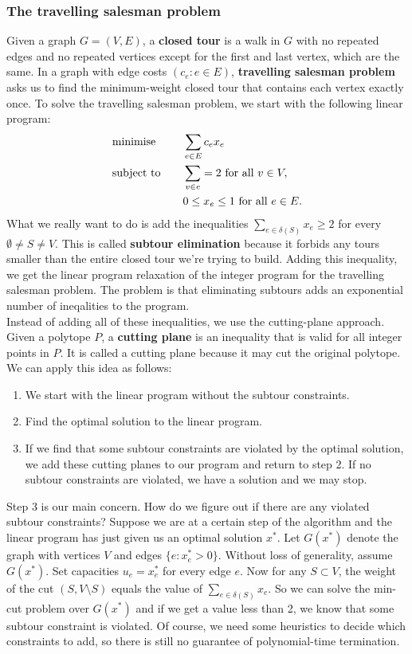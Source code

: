 \documentclass[12pt]{article}
\theoremstyle{plain}
\begin{document}
\subsubsection{The travelling salesman problem}
Given a graph $G=(V,E)$, a \textbf{closed tour} is a walk in $G$ with no repeated edges and no repeated vertices except for the first and last vertex, which are the same. In a graph with edge costs $(c_e : e\in E)$, \textbf{travelling salesman problem} asks us to find the minimum-weight closed tour that contains each vertex exactly once. To solve the travelling salesman problem, we start with the following linear program:
\begin{alignat*}{2}
    & \textup{minimise} & \quad & \sum_{e\in E} c_ex_e \\
    & \textup{subject to} & & \sum_{v\in e} = 2\ \text{for all}\ v\in V,\\
    &  & & 0\leq x_e \leq 1\ \text{for all}\ e\in E.
\end{alignat*}
What we really want to do is add the inequalities $\displaystyle\sum_{e\in \delta(S)} x_e \geq 2$ for every $\emptyset \neq S \neq V$. This is called \textbf{subtour elimination} because it forbids any tours smaller than the entire closed tour we're trying to build. Adding this inequality, we get the linear program relaxation of the integer program for the travelling salesman problem. The problem is that eliminating subtours adds an exponential number of ineqalities to the program.\\
\indent Instead of adding all of these inequalities, we use the cutting-plane approach. Given a polytope $P$, a \textbf{cutting plane} is an inequality that is valid for all integer points in $P$. It is called a cutting plane because it may cut the original polytope. We can apply this idea as follows:
\begin{enumerate}
    \item We start with the linear program without the subtour constraints.
    \item Find the optimal solution to the linear program.
    \item If we find that some subtour constraints are violated by the optimal solution, we add these cutting planes to our program and return to step 2. If no subtour constraints are violated, we have a solution and we may stop.
\end{enumerate}
Step 3 is our main concern. How do we figure out if there are any violated subtour constraints? Suppose we are at a certain step of the algorithm and the linear program has just given us an optimal solution $x^*$. Let $G(x^*)$ denote the graph with vertices $V$ and edges $\{e : x_e^* > 0\}$. Without loss of generality, assume $G(x^*)$. Set capacities $u_e = x_e^*$ for every edge $e$. Now for any $S\subset V$, the weight of the cut $(S, V\setminus S)$ equals the value of $\displaystyle\sum_{e\in \delta(S)} x_e$. So we can solve the min-cut problem over $G(x^*)$ and if we get a value less than 2, we know that some subtour constraint is violated. Of course, we need some heuristics to decide which constraints to add, so there is still no guarantee of polynomial-time termination.
\end{document}
